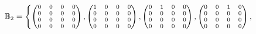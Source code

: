\documentclass[11pt]{article}
\begin{document}
$
\mathbb B_2 = 
\left\{  \scriptsize{
              \begin{pmatrix}
                        0&0&0&0\\
                        0&0&0&0\\
                        0&0&0&0\\
                        0&0&0&0\\
                \end{pmatrix},
                \begin{pmatrix}
                        1&0&0&0\\
                        0&0&0&0\\
                        0&0&0&0\\
                        0&0&0&0\\
                        \end{pmatrix},  
                        \begin{pmatrix}
                        0&1&0&0\\
                        0&0&0&0\\
                        0&0&0&0\\
                        0&0&0&0\\
                        \end{pmatrix},
                        \begin{pmatrix}
                        0&0&1&0\\
                        0&0&0&0\\
                        0&0&0&0\\
                        0&0&0&0\\
                        \end{pmatrix},}\right.$ \\[4pt]
 
\end{document}
